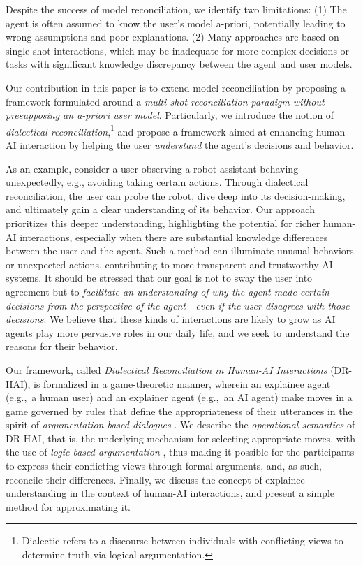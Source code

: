 \documentclass[letterpaper]{article} %
\begin{document}
Despite the success of model reconciliation, we identify two limitations: (1) The agent is often assumed to know the user's model a-priori, potentially leading to wrong assumptions and poor explanations. (2) Many approaches are based on single-shot interactions, which may be inadequate for more complex decisions or tasks with significant knowledge discrepancy between the agent and user models.


Our contribution in this paper is to extend model reconciliation by proposing a framework formulated around a \emph{multi-shot reconciliation paradigm without presupposing an a-priori user model}. Particularly, we introduce the notion of \emph{dialectical reconciliation},\footnote{Dialectic refers to a discourse between individuals with conflicting views to determine truth via logical argumentation.} and propose a framework aimed at enhancing human-AI interaction by helping the user \textit{understand} the agent's decisions and behavior. 

As an example, consider a user observing a robot assistant behaving unexpectedly, e.g., avoiding taking certain actions. Through dialectical reconciliation, the user can probe the robot, dive deep into its decision-making, and ultimately gain a clear understanding of its behavior. Our approach prioritizes this deeper understanding, highlighting the potential for richer human-AI interactions, especially when there are substantial knowledge differences between the user and the agent. Such a method can illuminate unusual behaviors or unexpected actions, contributing to more transparent and trustworthy AI systems. It should be stressed that our goal is not to sway the user into agreement but to \textit{facilitate an understanding of why the agent made certain decisions from the perspective of the agent—even if the user disagrees with those decisions}. We believe that these kinds of interactions are likely to grow as AI agents play more pervasive roles in our daily life, and we seek to understand the reasons for their behavior.

Our framework, called \emph{Dialectical Reconciliation in Human-AI Interactions} (DR-HAI), is formalized in a game-theoretic manner, wherein an explainee agent (e.g.,~a human user) and an explainer agent (e.g.,~an AI agent) make moves in a game governed by rules that define the appropriateness of their utterances in the spirit of \textit{argumentation-based dialogues} \cite{walton1995commitment,parsons2003properties,black2009inquiry}. We describe the \emph{operational semantics} of DR-HAI, that is, the underlying mechanism for selecting appropriate moves, with the use of \emph{logic-based argumentation} \cite{besnard2001logic}, thus making it possible for the participants to express their conflicting views through formal arguments, and, as such, reconcile their differences. Finally, we discuss the concept of explainee understanding in the context of human-AI interactions, and present a simple method for approximating it.
\end{document}
